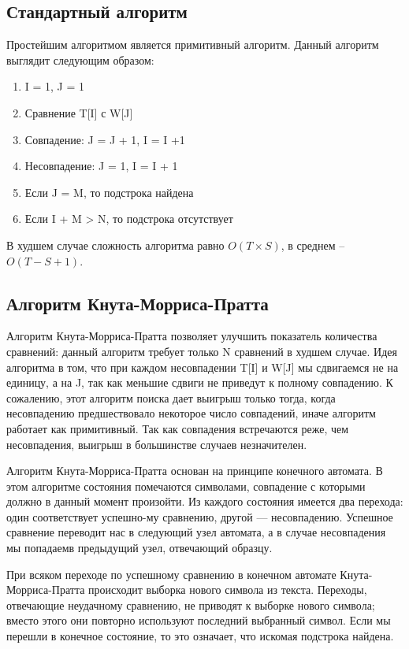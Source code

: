 \documentclass[a4paper, 14pt]{article}
\begin{document}
\subsection {Стандартный алгоритм} 

Простейшим алгоритмом является примитивный алгоритм. Данный алгоритм выглядит следующим образом:

\begin{enumerate}
\item	I = 1, J = 1
\item Сравнение T[I] с W[J]
\item Совпадение: J = J + 1, I = I +1
\item	Несовпадение: J = 1, I = I + 1
\item	Если J = M, то подстрока найдена
\item Если I + M > N, то подстрока отсутствует
\end{enumerate}

В худшем случае сложность алгоритма равно $O(T\times S)$, в среднем – $O(T-S+1)$.

\subsection {Алгоритм Кнута-Морриса-Пратта} 

Алгоритм Кнута-Морриса-Пратта позволяет улучшить показатель количества сравнений: данный алгоритм требует только N сравнений в худшем случае.
	Идея алгоритма в том, что при каждом несовпадении T[I] и W[J] мы сдвигаемся не на единицу, а на J, так как меньшие сдвиги не приведут к полному совпадению. К сожалению, этот алгоритм поиска дает выигрыш только тогда, когда несовпадению предшествовало некоторое число совпадений, иначе алгоритм работает как примитивный. Так как совпадения встречаются реже, чем несовпадения, выигрыш в большинстве случаев незначителен.

Алгоритм  Кнута-Морриса-Пратта  основан  на  принципе  конечного автомата.     В  этом  алгоритме  состояния  помечаются  символами,  совпадение  с  которыми  должно  в  данный  момент  произойти.  Из каждого  состояния  имеется  два перехода:  один соответствует  успешно-му сравнению,  другой — несовпадению.
Успешное сравнение переводит нас  в  следующий  узел  автомата,  а  в  случае  несовпадения  мы  попадаемв  предыдущий  узел,   отвечающий  образцу.

При  всяком  переходе  по  успешному  сравнению  в  конечном  автомате Кнута-Морриса-Пратта  происходит  выборка  нового  символа  из  текста.   Переходы,  отвечающие  неудачному  сравнению,  не  приводят  к  выборке  нового  символа;  вместо  этого  они  повторно  используют  последний выбранный  символ.  Если  мы перешли  в  конечное состояние,  то это означает,  что  искомая  подстрока  найдена.
\end{document}
